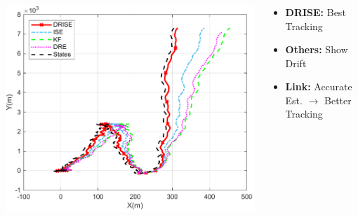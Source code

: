 \documentclass[handout, aspectratio=169]{beamer}
\begin{document}
\begin{frame}
    \frametitle{}
     \begin{columns}[T] %
        \begin{column}{0.5\textwidth} %
            \centering %
             \includegraphics[width=\textwidth]{figs/Reference_Trajectory_Tracking.pdf} %
        \end{column}
        \begin{column}{0.5\textwidth} %
            \begin{tcolorbox}[colbacktitle=title1, title=\textbf{Analysis}]
                \begin{itemize}
                    \item<1-> \textbf{DRISE:} Best Tracking \pause
                    \item<2-> \textbf{Others:} Show Drift \pause
                    \item<3-> \textbf{Link:} Accurate Est. $\rightarrow$ Better Tracking
                \end{itemize}
            \end{tcolorbox}
        \end{column}
    \end{columns}
\end{frame}
\end{document}
